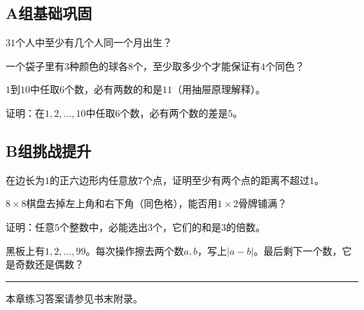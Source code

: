 
\subsection*{A组\quad 基础巩固}

\begin{exercise}
\item $31$个人中至少有几个人同一个月出生？
\item 一个袋子里有$3$种颜色的球各$8$个，至少取多少个才能保证有$4$个同色？
\item $1$到$10$中任取$6$个数，必有两数的和是$11$（用抽屉原理解释）。
\item 证明：在$1,2,\dots,10$中任取$6$个数，必有两个数的差是$5$。
\end{exercise}

\subsection*{B组\quad 挑战提升}

\begin{exercise}
\item 在边长为$1$的正六边形内任意放$7$个点，证明至少有两个点的距离不超过$1$。
\item $8\times8$棋盘去掉左上角和右下角（同色格），能否用$1\times2$骨牌铺满？
\item 证明：任意$5$个整数中，必能选出$3$个，它们的和是$3$的倍数。
\item 黑板上有$1,2,\dots,99$。每次操作擦去两个数$a,b$，写上$|a-b|$。最后剩下一个数，它是奇数还是偶数？
\end{exercise}

\vfill
\noindent\rule{\textwidth}{0.4pt}
本章练习答案请参见书末附录。
